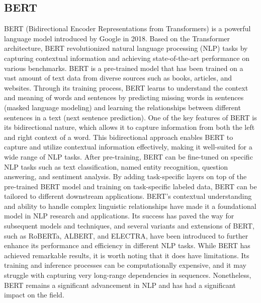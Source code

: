 \subsection{BERT}
BERT (Bidirectional Encoder Representations from Transformers) is a powerful language model introduced by Google in 2018. Based on the Transformer architecture, BERT revolutionized natural language processing (NLP) tasks by capturing contextual information and achieving state-of-the-art performance on various benchmarks.
BERT is a pre-trained model that has been trained on a vast amount of text data from diverse sources such as books, articles, and websites. Through its training process, BERT learns to understand the context and meaning of words and sentences by predicting missing words in sentences (masked language modeling) and learning the relationships between different sentences in a text (next sentence prediction).
One of the key features of BERT is its bidirectional nature, which allows it to capture information from both the left and right context of a word. This bidirectional approach enables BERT to capture and utilize contextual information effectively, making it well-suited for a wide range of NLP tasks.
After pre-training, BERT can be fine-tuned on specific NLP tasks such as text classification, named entity recognition, question answering, and sentiment analysis. By adding task-specific layers on top of the pre-trained BERT model and training on task-specific labeled data, BERT can be tailored to different downstream applications.
BERT's contextual understanding and ability to handle complex linguistic relationships have made it a foundational model in NLP research and applications. Its success has paved the way for subsequent models and techniques, and several variants and extensions of BERT, such as RoBERTa, ALBERT, and ELECTRA, have been introduced to further enhance its performance and efficiency in different NLP tasks.
While BERT has achieved remarkable results, it is worth noting that it does have limitations. Its training and inference processes can be computationally expensive, and it may struggle with capturing very long-range dependencies in sequences. Nonetheless, BERT remains a significant advancement in NLP and has had a significant impact on the field.
